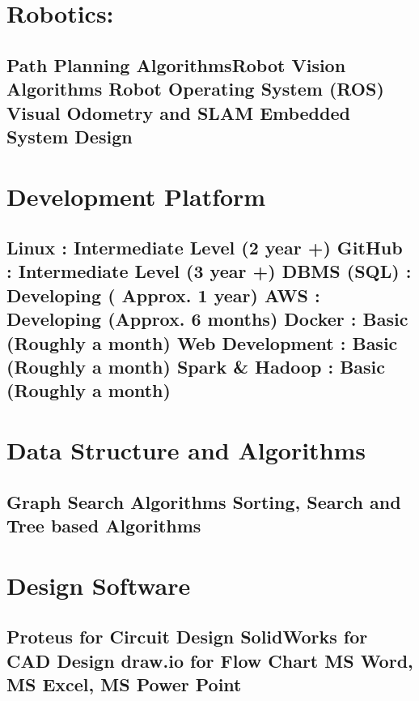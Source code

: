 \documentclass[letterpaper]{twentysecondcv} %
\begin{document}
{\section{\large Robotics:}\subsection{\small Path Planning Algorithms\newline Robot Vision Algorithms \newline Robot Operating System (ROS)
\newline Visual Odometry and SLAM \newline Embedded System Design }

\section{\large Development Platform} \subsection{\small Linux : Intermediate Level (2 year +) \newline GitHub : Intermediate Level (3 year +) \newline DBMS (SQL) : Developing ( Approx. 1 year)  
\newline AWS : Developing (Approx. 6 months)  
\newline Docker : Basic (Roughly a month)
\newline Web Development : Basic (Roughly a month)
\newline Spark \& Hadoop : Basic (Roughly a month) }

\section{\large Data Structure and Algorithms}\subsection{\small Graph Search Algorithms \newline Sorting, Search and Tree based Algorithms}

\section{\large Design Software} \subsection{\small Proteus for Circuit Design \newline SolidWorks for CAD Design \newline draw.io for Flow Chart \newline MS Word, MS Excel, MS Power Point}

}
\makeprofilenpage
\end{document}
